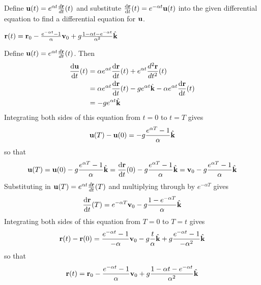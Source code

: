 \begin{hint}
Define $\mathbf{u}(t)=e^{\alpha t}\frac{d\mathbf{r}}{dt}(t)$ and substitute
$\diff{\vr}{t}(t)=e^{-\alpha t}\vu(t)$ into the given 
differential equation to find a differential equation for $\mathbf{u}$.
\end{hint}

\begin{answer}
$\mathbf{r}(t)=\mathbf{r}_0-\frac{e^{-\alpha t}-1}{\alpha}\mathbf{v}_0
+g\frac{1-\alpha t-e^{-\alpha t}}{\alpha^2}\hat{\mathbf{k}}$
\end{answer}

\begin{solution}
Define $\mathbf{u}(t)=e^{\alpha t}\frac{d\mathbf{r}}{dt}(t)$. Then
\begin{align*}
\diff{\vu}{t}(t)&=\alpha e^{\alpha t}\diff{\vr}{t}(t)
+e^{\alpha t}\frac{d^2\vr}{dt^2}(t)\\
&=\alpha e^{\alpha t}\diff{\vr}{t}(t)
-ge^{\alpha t}\hk
-\alpha e^{\alpha t}\diff{\vr}{t}(t)\\
&=-ge^{\alpha t}\hk
\end{align*}
Integrating both sides of this equation from $t=0$ to $t=T$ gives
\begin{equation*}
\mathbf{u}(T)-\mathbf{u}(0)=-g\frac{e^{\alpha T}-1}{\alpha}\hat{\mathbf{k}}
\end{equation*}
so that
\begin{equation*}
\vu(T)=\vu(0)-g\frac{e^{\alpha T}-1}{\alpha}\hk
=\diff{\vr}{t}(0)-g\frac{e^{\alpha T}-1}{\alpha}\hk
=\vv_0-g\frac{e^{\alpha T}-1}{\alpha}\hk
\end{equation*}
Substituting in $\mathbf{u}(T)=e^{\alpha t}\frac{d\mathbf{r}}{dt}(T)$ and multiplying
through by $e^{-\alpha T}$ gives
\begin{equation*}
\diff{\vr}{t}(T)
=e^{-\alpha T}\vv_0-g\frac{1-e^{-\alpha T}}{\alpha}\hk
\end{equation*}
Integrating both sides of this equation from $T=0$ to $T=t$ gives
\begin{align*}
\mathbf{r}(t)-\mathbf{r}(0)
=\frac{e^{-\alpha t}-1}{-\alpha}\mathbf{v}_0-g\frac{ t}{\alpha}\hat{\mathbf{k}}
+g\frac{e^{-\alpha t}-1}{-\alpha^2}\hat{\mathbf{k}}
\end{align*}
so that
\begin{align*}
\mathbf{r}(t)=\mathbf{r}_0-\frac{e^{-\alpha t}-1}{\alpha}\mathbf{v}_0
+g\frac{1-\alpha t-e^{-\alpha t}}{\alpha^2}\hat{\mathbf{k}}
\end{align*}
\end{solution}

